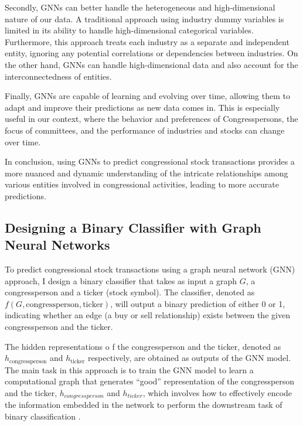 \documentclass[15pt,letterpaper]{article}
\begin{document}
Secondly, GNNs can better handle the heterogeneous and high-dimensional nature of our data. A traditional approach using industry dummy variables is limited in its ability to handle high-dimensional categorical variables. Furthermore, this approach treats each industry as a separate and independent entity, ignoring any potential correlations or dependencies between industries. On the other hand, GNNs can handle high-dimensional data and also account for the interconnectedness of entities.

Finally, GNNs are capable of learning and evolving over time, allowing them to adapt and improve their predictions as new data comes in. This is especially useful in our context, where the behavior and preferences of Congresspersons, the focus of committees, and the performance of industries and stocks can change over time.

In conclusion, using GNNs to predict congressional stock transactions provides a more nuanced and dynamic understanding of the intricate relationships among various entities involved in congressional activities, leading to more accurate predictions.

\subsection{Designing a Binary Classifier with Graph Neural Networks}

To predict congressional stock transactions using a graph neural network (GNN) approach, I design a binary classifier that takes as input a graph $G$, a congressperson and a ticker (stock symbol). The classifier, denoted as $f(G, \text{congressperson}, \text{ticker})$, will output a binary prediction of either 0 or 1, indicating whether an edge (a buy or sell relationship) exists between the given congressperson and the ticker.

The hidden representations \citep{hd1, hd2}o f the congressperson and the ticker, denoted as $h_{\text{congressperson}}$ and $h_{\text{ticker}}$ respectively, are obtained as outputs of the GNN model. The main task in this approach is to train the GNN model to learn a computational graph that generates ``good'' representation of the congressperson and the ticker, $h_{congressperson}$ and $h_{ticker}$, which involves how to effectively encode the information embedded in the network to perform the downstream task of binary classification \citep{hdforc}.
\end{document}
